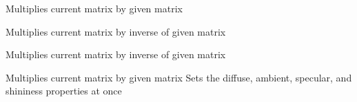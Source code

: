 
\begin{DoxyRefList}
\item[\label{deprecated__deprecated000001}%
\Hypertarget{deprecated__deprecated000001}%
Member \hyperlink{namespace_c_s_c_i441_a497b04f17c79e094cc4cce87cdf58262}{C\+S\+C\+I441\+:\+:D\+E\+P\+R\+E\+C\+A\+T\+ED} (void \hyperlink{namespace_c_s_c_i441_aa818e8189c42c50e88d6d0512274bcfb}{push\+Matrix(glm\+::mat4 mtx)})]Multiplies current matrix by given matrix 

Multiplies current matrix by inverse of given matrix 

Multiplies current matrix by inverse of given matrix  
\item[\label{deprecated__deprecated000003}%
\Hypertarget{deprecated__deprecated000003}%
Member \hyperlink{namespace_c_s_c_i441_a1b02a3d2b9323127b811be893d7a63e1}{C\+S\+C\+I441\+:\+:D\+E\+P\+R\+E\+C\+A\+T\+ED} (void \hyperlink{namespace_c_s_c_i441_ac201d649430f0c55e57db10b0dddd100}{set\+Material(\+Material\+Struct material)})]Multiplies current matrix by given matrix Sets the diffuse, ambient, specular, and shininess properties at once
\end{DoxyRefList}